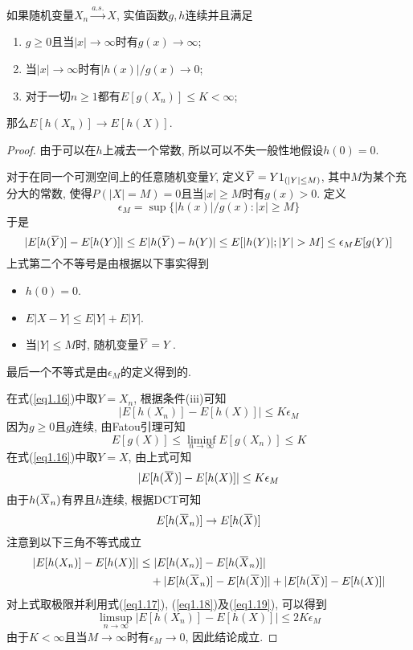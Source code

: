 \documentclass[cn, 12pt, math=mtpro2, bibstyle=apa, blue, twocol]{elegantbook}
\newcommand{\overbar}[1]{\mkern 1.5mu\overline{\mkern-1.5mu#1\mkern-1.5mu}\mkern 1.5mu}
\begin{document}
 \begin{theorem}\label{thm:thm1.17}
   如果随机变量$X_n\xrightarrow{a.s.}X$, 实值函数$g, h$连续并且满足
   \begin{enumerate}[label=(\arabic*)]
     \item $g\geq0$且当$|x|\to\infty$时有$g(x)\to\infty$;
     \item 当$|x|\to\infty$时有$|h(x)|/g(x)\to0$;
     \item 对于一切$n\ge1$都有$E[g(X_n)]\leq K<\infty$;
   \end{enumerate}
   那么$E[h(X_n)]\to E[h(X)]$.
 \end{theorem}
 \begin{proof}
   由于可以在$h$上减去一个常数, 所以可以不失一般性地假设$h(0)=0$.

   对于在同一个可测空间上的任意随机变量$Y$, 定义$\overbar{Y}=Y1_{(|Y|\leq M)}$, 其中$M$为某个充分大的常数, 使得$P(|X|=M)=0$且当$|x|\geq M$时有$g(x)>0$. 定义
   $$\epsilon_M=\sup\{|h(x)|/g(x): |x|\geq M\}$$
   于是
   \begin{equation}\label{eq1.16}
     |E[h(\overbar{Y})]-E[h(Y)]|\leq E|h(\overbar{Y})-h(Y)|\leq E[|h(Y)|;|Y|>M]\leq \epsilon_ME[g(Y)]
   \end{equation}
   上式第二个不等号是由根据以下事实得到
   \begin{itemize}
     \item $h(0)=0$.
     \item $E|X-Y|\leq E|Y|+E|Y|$.
     \item 当$|Y|\leq M$时, 随机变量$\overbar{Y}=Y$.
   \end{itemize}
   最后一个不等式是由$\epsilon_M$的定义得到的.

   在式(\ref{eq1.16})中取$Y=X_n$, 根据条件(iii)可知
   \begin{equation}\label{eq1.17}
     |E[h(X_n)]-E[h(X)]|\leq K\epsilon_M
   \end{equation}
   因为$g\geq0$且$g$连续, 由Fatou引理可知
   $$E[g(X)]\leq\liminf_{n\to\infty} E[g(X_n)]\leq K$$
   在式(\ref{eq1.16})中取$Y=X$, 由上式可知
   \begin{equation}\label{eq1.18}
     |E[h(\overbar{X})]-E[h(X)]|\leq K\epsilon_M
   \end{equation}
   由于$h(\overbar{X}_n)$有界且$h$连续, 根据DCT可知
   \begin{equation}\label{eq1.19}
     E[h(\overbar{X}_n)]\to E[h(\overbar{X})]
   \end{equation}
   注意到以下三角不等式成立
   \begin{align*}
   |E[h(X_n)]-E[h(X)]|&\leq |E[h(X_n)]-E[h(\overbar{X}_n)]| \\
   &\quad +|E[h(\overbar{X}_n)]-E[h(\overbar{X})]|+|E[h(\overbar{X})]-E[h(X)]|
   \end{align*}
   对上式取极限并利用式(\ref{eq1.17}), (\ref{eq1.18})及(\ref{eq1.19}), 可以得到
   $$\limsup_{n\to\infty}|E[h(X_n)]-E[h(X)]|\leq 2K\epsilon_M$$
   由于$K<\infty$且当$M\to\infty$时有$\epsilon_M\to0$, 因此结论成立.
 \end{proof}
\end{document}
